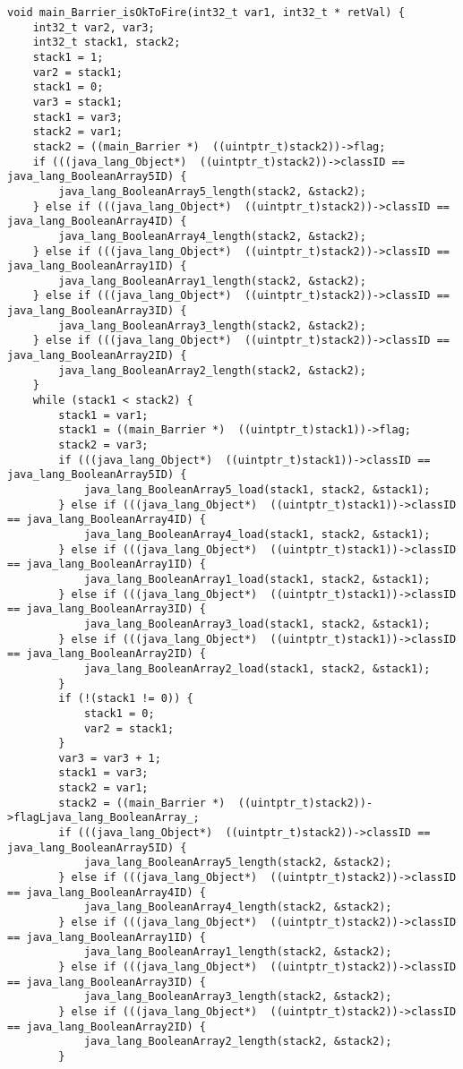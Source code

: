 \begin{landscape}
\begin{multicols}{2}
\begin{lstlisting}[firstnumber=472]
void main_Barrier_isOkToFire(int32_t var1, int32_t * retVal) {
	int32_t var2, var3;
	int32_t stack1, stack2;
	stack1 = 1;
	var2 = stack1;
	stack1 = 0;
	var3 = stack1;
	stack1 = var3;
	stack2 = var1;
	stack2 = ((main_Barrier *)  ((uintptr_t)stack2))->flag;
	if (((java_lang_Object*)  ((uintptr_t)stack2))->classID == java_lang_BooleanArray5ID) {
		java_lang_BooleanArray5_length(stack2, &stack2);
	} else if (((java_lang_Object*)  ((uintptr_t)stack2))->classID == java_lang_BooleanArray4ID) {
		java_lang_BooleanArray4_length(stack2, &stack2);
	} else if (((java_lang_Object*)  ((uintptr_t)stack2))->classID == java_lang_BooleanArray1ID) {
		java_lang_BooleanArray1_length(stack2, &stack2);
	} else if (((java_lang_Object*)  ((uintptr_t)stack2))->classID == java_lang_BooleanArray3ID) {
		java_lang_BooleanArray3_length(stack2, &stack2);
	} else if (((java_lang_Object*)  ((uintptr_t)stack2))->classID == java_lang_BooleanArray2ID) {
		java_lang_BooleanArray2_length(stack2, &stack2);
	}
	while (stack1 < stack2) {
		stack1 = var1;
		stack1 = ((main_Barrier *)  ((uintptr_t)stack1))->flag;
		stack2 = var3;
		if (((java_lang_Object*)  ((uintptr_t)stack1))->classID == java_lang_BooleanArray5ID) {
			java_lang_BooleanArray5_load(stack1, stack2, &stack1);
		} else if (((java_lang_Object*)  ((uintptr_t)stack1))->classID == java_lang_BooleanArray4ID) {
			java_lang_BooleanArray4_load(stack1, stack2, &stack1);
		} else if (((java_lang_Object*)  ((uintptr_t)stack1))->classID == java_lang_BooleanArray1ID) {
			java_lang_BooleanArray1_load(stack1, stack2, &stack1);
		} else if (((java_lang_Object*)  ((uintptr_t)stack1))->classID == java_lang_BooleanArray3ID) {
			java_lang_BooleanArray3_load(stack1, stack2, &stack1);
		} else if (((java_lang_Object*)  ((uintptr_t)stack1))->classID == java_lang_BooleanArray2ID) {
			java_lang_BooleanArray2_load(stack1, stack2, &stack1);
		}
		if (!(stack1 != 0)) {
			stack1 = 0;
			var2 = stack1;
		}
		var3 = var3 + 1;
		stack1 = var3;
		stack2 = var1;
		stack2 = ((main_Barrier *)  ((uintptr_t)stack2))->flagLjava_lang_BooleanArray_;
		if (((java_lang_Object*)  ((uintptr_t)stack2))->classID == java_lang_BooleanArray5ID) {
			java_lang_BooleanArray5_length(stack2, &stack2);
		} else if (((java_lang_Object*)  ((uintptr_t)stack2))->classID == java_lang_BooleanArray4ID) {
			java_lang_BooleanArray4_length(stack2, &stack2);
		} else if (((java_lang_Object*)  ((uintptr_t)stack2))->classID == java_lang_BooleanArray1ID) {
			java_lang_BooleanArray1_length(stack2, &stack2);
		} else if (((java_lang_Object*)  ((uintptr_t)stack2))->classID == java_lang_BooleanArray3ID) {
			java_lang_BooleanArray3_length(stack2, &stack2);
		} else if (((java_lang_Object*)  ((uintptr_t)stack2))->classID == java_lang_BooleanArray2ID) {
			java_lang_BooleanArray2_length(stack2, &stack2);
		}


\end{lstlisting}
\end{multicols}
\end{landscape}
